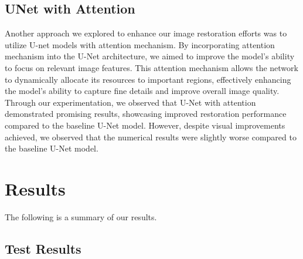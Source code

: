 \documentclass{article}
\begin{document}
\subsection{UNet with Attention}
Another approach we explored to enhance our image restoration efforts was to utilize U-net models with attention mechanism. By incorporating attention mechanism into the U-Net architecture, we aimed to improve the model's ability to focus on relevant image features. This attention mechanism allows the network to dynamically allocate its resources to important regions, effectively enhancing the model's ability to capture fine details and improve overall image quality. Through our experimentation, we observed that U-Net with attention demonstrated promising results, showcasing improved restoration performance compared to the baseline U-Net model. However, despite visual improvements achieved, we observed that the numerical results were slightly worse compared to the baseline U-Net model.

\section{Results}
The following is a summary of our results.

\subsection{Test Results}
\end{document}
